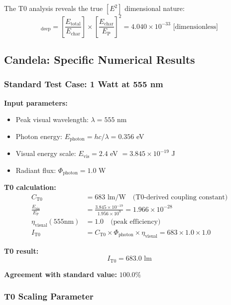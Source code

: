 \documentclass[12pt,a4paper]{article}
\newcommand{\EP}{E_{\text{P}}}
\newcommand{\Echar}{E_{\text{char}}}
\newcommand{\Evis}{E_{\text{vis}}}
\newcommand{\Cto}{C_{\text{T0}}}
\newcommand{\etavis}{\eta_{\text{visual}}}
\newcommand{\Phiphoton}{\Phi_{\text{photon}}}
\begin{document}
	The T0 analysis reveals the true $[E^2]$ dimensional nature:
	\begin{equation}
		[n_{\text{T0}}]_{\text{deep}} = \left[\frac{E_{\text{total}}}{\Echar}\right] \times \left[\frac{\Echar}{\EP}\right]^2 = 4.040 \times 10^{-33} \text{ [dimensionless]}
		\label{eq:mol_e2_dimension}
	\end{equation}
	
	\subsection{Candela: Specific Numerical Results}
	\label{subsec:candela_numerical_results}
	
	\subsubsection{Standard Test Case: 1 Watt at 555 nm}
	\label{subsubsec:candela_555nm_test}
	
	\textbf{Input parameters:}
	\begin{itemize}
		\item Peak visual wavelength: $\lambda = 555$ nm
		\item Photon energy: $E_{\text{photon}} = hc/\lambda = 0.356$ eV
		\item Visual energy scale: $\Evis = 2.4$ eV $= 3.845 \times 10^{-19}$ J
		\item Radiant flux: $\Phiphoton = 1.0$ W
	\end{itemize}
	
	\textbf{T0 calculation:}
	\begin{align}
		\Cto &= 683 \text{ lm/W} \quad \text{(T0-derived coupling constant)} \\
		\frac{\Evis}{\EP} &= \frac{3.845 \times 10^{-19}}{1.956 \times 10^{9}} = 1.966 \times 10^{-28} \\
		\etavis(555\text{nm}) &= 1.0 \quad \text{(peak efficiency)} \\
		I_{\text{T0}} &= \Cto \times \Phiphoton \times \etavis = 683 \times 1.0 \times 1.0
	\end{align}
	
	\textbf{T0 result:}
	\begin{equation}
		\boxed{I_{\text{T0}} = 683.0 \text{ lm}}
		\label{eq:candela_t0_result}
	\end{equation}
	
	\textbf{Agreement with standard value:} $\mathbf{100.0\%}$
	
	\subsubsection{T0 Scaling Parameter}
	\label{subsubsec:candela_scaling_parameter}
	
\end{document}
